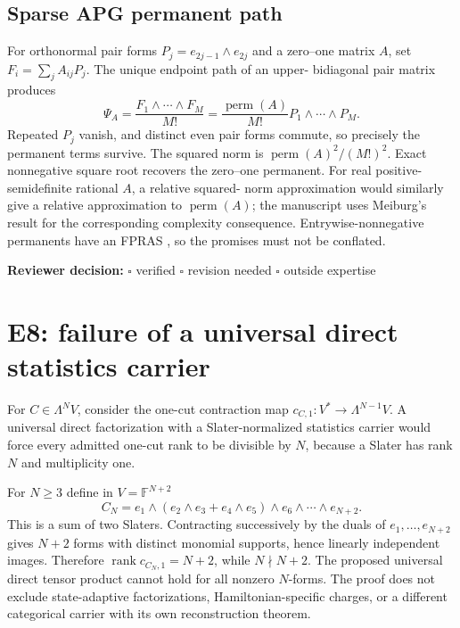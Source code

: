 \documentclass[11pt]{article}
\theoremstyle{definition}
\newcommand{\rank}{\operatorname{rank}}
\newcommand{\perm}{\operatorname{perm}}
\newcommand{\reviewline}{\par\smallskip\noindent
  \textbf{Reviewer decision:} $\square$ verified \quad $\square$ revision
  needed \quad $\square$ outside expertise\par\medskip}
\begin{document}
\subsection{Sparse APG permanent path}

For orthonormal pair forms $P_j=e_{2j-1}\wedge e_{2j}$ and a zero--one matrix
$A$, set $F_i=\sum_jA_{ij}P_j$.  The unique endpoint path of an upper-
bidiagonal pair matrix produces
\begin{equation}
\Psi_A=\frac{F_1\wedge\cdots\wedge F_M}{M!}
=\frac{\perm(A)}{M!}P_1\wedge\cdots\wedge P_M.
\end{equation}
Repeated $P_j$ vanish, and distinct even pair forms commute, so precisely the
permanent terms survive.  The squared norm is
$\perm(A)^2/(M!)^2$.  Exact nonnegative square root recovers the zero--one
permanent.  For real positive-semidefinite rational $A$, a relative squared-
norm approximation would similarly give a relative approximation to
$\perm(A)$; the manuscript uses Meiburg's result for the corresponding
complexity consequence.  Entrywise-nonnegative permanents have an FPRAS
\cite{JerrumSinclairVigoda2004PermanentFPRAS}, so the promises must not be
conflated.

\reviewline

\section{E8: failure of a universal direct statistics carrier}

For $C\in\Lambda^N V$, consider the one-cut contraction map
$c_{C,1}:V^*\to\Lambda^{N-1}V$.  A universal direct factorization with a
Slater-normalized statistics carrier would force every admitted one-cut rank
to be divisible by $N$, because a Slater has rank $N$ and multiplicity one.

For $N\ge3$ define in $V=\mathbb F^{N+2}$
\begin{equation}
C_N=e_1\wedge(e_2\wedge e_3+e_4\wedge e_5)
\wedge e_6\wedge\cdots\wedge e_{N+2}.
\end{equation}
This is a sum of two Slaters.  Contracting successively by the duals of
$e_1,\ldots,e_{N+2}$ gives $N+2$ forms with distinct monomial supports, hence
linearly independent images.  Therefore $\rank c_{C_N,1}=N+2$, while
$N\nmid N+2$.  The proposed universal direct tensor product cannot hold for
all nonzero $N$-forms.  The proof does not exclude state-adaptive
factorizations, Hamiltonian-specific charges, or a different categorical
carrier with its own reconstruction theorem.
\end{document}
